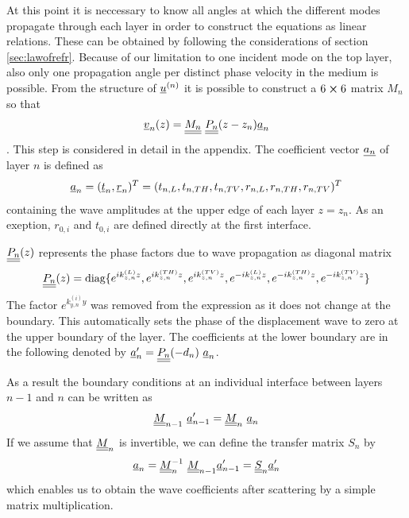 At this point it is neccessary to know all angles at which the different modes
propagate through each layer in order to construct the equations as linear
relations. These can be obtained by following the considerations of section
\ref{sec:lawofrefr}.  Because of our limitation to one incident mode on the top
layer, also only one propagation angle per distinct phase velocity in the
medium is possible. From the structure of
$\underline{u}^{(n)}$ it is possible to construct a $6\cross6$ matrix $M_n$ so that
\begin{equation} \label{eq:statevector}
    \uline{v}_n(z) = \uuline{M_n}\ \uuline{P_n}(z-z_n)\uline{a}_n
\end{equation}.
This step is considered in detail in the appendix. The coefficient vector
$\underline{a_n}$ of layer $n$ is defined as
\begin{equation}
    \underline{a}_n = (\underline{t}_n, \underline{r}_n)^T	= (t_{n,L}, t_{n,TH}, t_{n,TV},
    r_{n,L}, r_{n,TH}, r_{n,TV})^T
\end{equation}
containing the wave amplitudes at the upper edge of each layer $z = z_n$. As an
exeption, $r_{0,i}$ and $t_{0,i}$ are defined directly at the first interface.

$\underline{\underline{P_n}}(z)$ represents the phase factors due to wave propagation
as diagonal matrix
\begin{equation} \label{eq:PmatTMM}
    \underline{\underline{P_n}}(z) = \text{diag}\{ e^{ik_{z,n}^{(L)}z},
    e^{ik_{z,n}^{(TH)}z},
    e^{ik_{z,n}^{(TV)}z}, e^{-ik_{z,n}^{(L)}z}, e^{-ik_{z,n}^{(TH)}z},
    e^{-ik_{z,n}^{(TV)}z}\}
\end{equation}
The factor $e^{k_{y,n}^{(i)} y}$ was removed from the expression as it does not
change at the boundary. This automatically sets the phase of the displacement
wave to zero at the upper boundary of the layer. The coefficients at the lower
boundary are in the following denoted by $\underline{a}_n^\prime =
    \underline{\underline{P_n}}(-d_n)\ \underline{a}_n$.

As a result the boundary conditions at an individual interface between layers
$n-1$ and $n$ can be written as
\begin{equation}
    \uuline{M}_{n-1}\ \uline{a}_{n-1}^\prime = \uuline{M}_{n}\ \uline{a}_{n}
\end{equation}
If we assume that $\underline{\underline{M}}_{n}$ is invertible, we can define the
transfer matrix $S_n$ by
\begin{equation} \label{eq:defSn}
    \underline{a}_{n} = \underline{\underline{M}}_{n}^{-1}\ \underline{\underline{M}}_{n-1}
    \underline{a}_{n-1}^\prime
    = \underline{\underline{S}}_n \underline{a}_n^\prime
\end{equation}
which enables us to obtain the wave coefficients after scattering by a simple
matrix multiplication.

